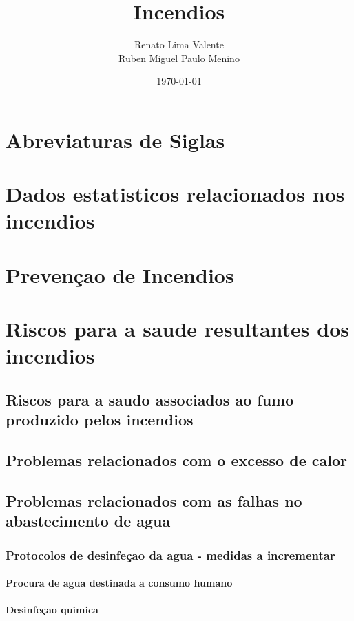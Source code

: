 \documentclass[a4paper,11pt,onecloumn,oneside]{article}
\title{Incendios}
\author{Renato Lima Valente \\Ruben Miguel Paulo Menino}
\date{\today}
\begin{document}
\maketitle

\part{Abreviaturas de Siglas}

\part{Dados estatisticos relacionados nos incendios}

\part{Prevençao de Incendios}

\part{Riscos para a saude resultantes dos incendios}

\chapter{Riscos para a saudo associados ao fumo produzido pelos incendios}
\chapter{Problemas relacionados com o excesso de calor}
\chapter{Problemas relacionados com as falhas no abastecimento de agua}

\section{Protocolos de desinfeçao da agua - medidas a incrementar}

\subsection{Procura de agua destinada a consumo humano}
\subsection{Desinfeçao quimica}
\end{document}
